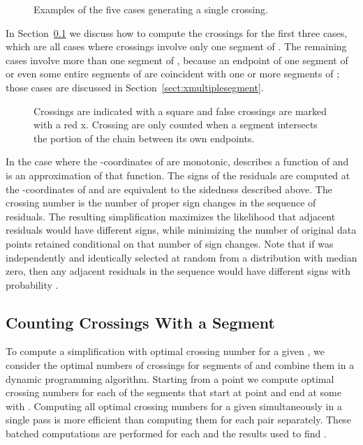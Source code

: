 \documentclass{article}
\begin{document}
\begin{figure}
\caption{Examples of the five cases generating a single crossing.}
\label{fig:cases}
\end{figure}

In Section~\ref{sect:xsingleseg} we discuss how to compute the crossings for the first three
cases, which are all cases where
crossings involve only one segment of .  The remaining cases involve more
than one segment of , because an endpoint of one segment of  or even
some entire segments of  are coincident with one or more segments of ;
those cases are discussed in Section~\ref{sect:xmultiplesegment}.
 	
\begin{figure}
\label{fig}
\qquad
{}
\qquad
{}
\caption{Crossings are indicated with a square and false crossings are
  marked with a red x.  Crossing are only counted when a segment intersects
  the portion of the chain between its own endpoints.}
\end{figure}
	


In the case where the -coordinates of  are monotonic,  describes a
function  of  and  is an approximation  of that function.  
The signs of the residuals  
are computed at the -coordinates of  and are equivalent to
the sidedness described above.  The crossing number is the
number of proper sign changes in the sequence of residuals.  The resulting
simplification maximizes the likelihood that adjacent residuals would have
different signs, while minimizing the number of original data points
retained conditional on that number of sign changes.  Note that if  was
independently and identically selected at random from a distribution with
median zero, then any adjacent residuals in the sequence
 would have different signs with probability .

\subsection{Counting Crossings With a Segment}
\label{sect:xsingleseg}

To compute a simplification  with optimal crossing number for a given ,
we consider the optimal numbers of crossings for segments of  and combine
them in a dynamic programming algorithm.  Starting from a point  we
compute optimal crossing numbers for each of the  segments that start
at point  and end at some  with .  Computing all 
optimal crossing numbers for a given  simultaneously in a single pass
is more efficient than computing them for each  pair separately. 
These batched computations are performed for each  and the results used
to find .
\end{document}
